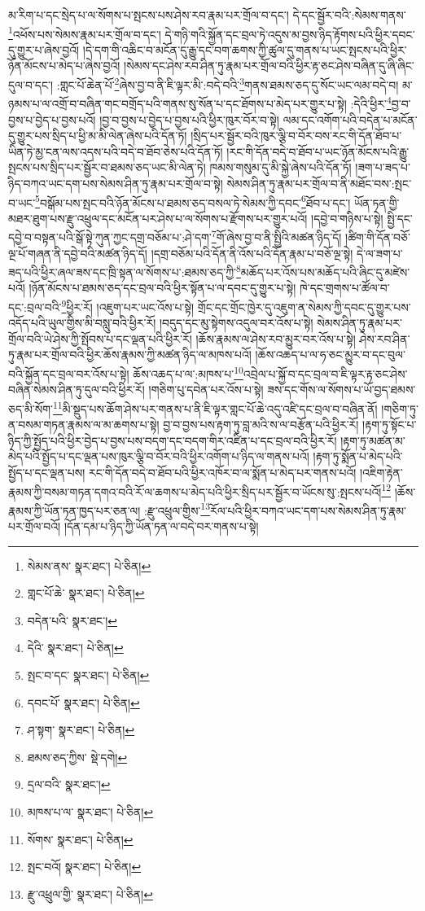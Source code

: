 མ་རིག་པ་དང་སྲེད་པ་ལ་སོགས་པ་སྤངས་པས་ཤེས་རབ་རྣམ་པར་གྲོལ་བ་དང་། དེ་དང་སྦྱོར་བའི་:སེམས་གནས་\footnote{སེམས་ནས་  སྣར་ཐང་།  པེ་ཅིན། }འཕོས་པས་སེམས་རྣམ་པར་གྲོལ་བ་དང་། དེ་གཉི་གའི་སྐྱོན་དང་བྲལ་ཏེ་འདུས་མ་བྱས་ཉིད་རྟོགས་པའི་ཕྱིར་དབང་དུ་གྱུར་པ་ཞེས་བྱའོ། །དེ་དག་གི་འཆིང་བ་མངོན་དུ་རྒྱུ་དང་བག་ཆགས་ཀྱི་ཚུལ་དུ་གནས་པ་ཡང་སྤངས་པའི་ཕྱིར་ཉོན་མོངས་པ་མེད་པ་ཞེས་བྱའོ། །སེམས་དང་ཤེས་རབ་ཤིན་ཏུ་རྣམ་པར་གྲོལ་བའི་ཕྱིར་རྟ་ཅང་ཤེས་བཞིན་དུ་ཞི་ཞིང་དུལ་བ་དང་། :གླང་པོ་ཆེན་པོ་\footnote{གླང་པོ་ཆེ་  སྣར་ཐང་།  པེ་ཅིན། }ཞེས་བྱ་བ་ནི་ཇི་ལྟར་མི་:བདེ་བའི་\footnote{བདེན་པའི་  སྣར་ཐང་། }གནས་ཐམས་ཅད་དུ་སོང་ཡང་ལམ་བདེ་བ། མ་ཉམས་པ་ལ་འགྲོ་བ་བཞིན་གང་བགྲོད་པའི་གནས་སུ་སོན་པ་དང་ཐོགས་པ་མེད་པར་གྱུར་པ་སྟེ། :དེའི་ཕྱིར་\footnote{དེའི་  སྣར་ཐང་།  པེ་ཅིན། }བྱ་བ་བྱས་པ་བྱེད་པ་བྱས་པའོ། །བྱ་བ་བྱས་པ་བྱེད་པ་བྱས་པའི་ཕྱིར་ཁུར་བོར་བ་སྟེ། ལམ་དང་འགོག་པའི་བདེན་པ་མངོན་དུ་གྱུར་པས་སྲིད་པ་ཕྱི་མ་མི་ལེན་ཞེས་པའི་དོན་ཏོ། །སྲིད་པར་སྦྱོར་བའི་ཁུར་ལྕི་བ་བོར་བས་རང་གི་དོན་ཐོབ་པ་ཡིན་ཏེ་མྱ་ངན་ལས་འདས་པའི་བདེ་བ་ཐོབ་ཅེས་པའི་དོན་ཏོ། །རང་གི་དོན་བདེ་བ་ཐོབ་པ་ཡང་ཉོན་མོངས་པའི་རྒྱུ་སྤངས་པས་སྲིད་པར་སྦྱོར་བ་ཐམས་ཅད་ཡང་མི་ལེན་ཏེ། ཁམས་གསུམ་དུ་མི་སྐྱེ་ཞེས་པའི་དོན་ཏོ། །ཟག་པ་ཟད་པ་ཉིད་བཀའ་ཡང་དག་པས་སེམས་ཤིན་ཏུ་རྣམ་པར་གྲོལ་བ་སྟེ། སེམས་ཤིན་ཏུ་རྣམ་པར་གྲོལ་བ་ནི་མཐོང་བས་:སྤང་བ་ཡང་\footnote{སྤང་བ་དང་  སྣར་ཐང་།  པེ་ཅིན། }བསྒོམ་པས་སྤང་བའི་ཉོན་མོངས་པ་ཐམས་ཅད་བསལ་ཏེ་སེམས་ཀྱི་དབང་\footnote{དབང་པོ་  སྣར་ཐང་།  པེ་ཅིན། }ཐོབ་པ་དང་། ཡོན་ཏན་གྱི་མཐར་ཐུག་པས་རྫུ་འཕྲུལ་དང་མངོན་པར་ཤེས་པ་ལ་སོགས་པ་རྫོགས་པར་གྱུར་པའོ། །དབྱེ་བ་གཉིས་པ་སྟེ། སྤྱི་དང་དབྱེ་བ་བསྟན་པའི་སྒོ་སྟེ་ཀུན་ཀྱང་དགྲ་བཅོམ་པ་:ཤེ་དག་\footnote{ཤ་སྟག་  སྣར་ཐང་།  པེ་ཅིན། }གོ་ཞེས་བྱ་བ་ནི་སྤྱིའི་མཚན་ཉིད་དོ། །ཚིག་གི་དོན་བཅོ་ལྔ་པོ་གཞན་ནི་དབྱེ་བའི་མཚན་ཉིད་དོ། །དགྲ་བཅོམ་པའི་དོན་ནི་འོས་པའི་དོན་རྣམ་པ་བཅོ་ལྔ་སྟེ། དེ་ལ་ཟག་པ་ཟད་པའི་ཕྱིར་ཞལ་ཟས་དང་ཁྲི་སྟན་ལ་སོགས་པ་:ཐམས་ཅད་ཀྱི་\footnote{ཐམས་ཅད་ཀྱིས་  སྡེ་དགེ། }མཆོད་པར་འོས་པས་མཆོད་པའི་ཞིང་དུ་མཛེས་པའོ། །ཉོན་མོངས་པ་ཐམས་ཅད་དང་བྲལ་བའི་ཕྱིར་སྟོན་པ་ལ་དབང་དུ་གྱུར་པ་སྟེ། ཁེ་དང་གྲགས་པ་ཚོལ་བ་དང་:བྲལ་བའི་\footnote{དྲལ་བའི་  སྣར་ཐང་། }ཕྱིར་རོ། །འཇུག་པར་ཡང་འོས་པ་སྟེ། གྲོང་དང་གྲོང་ཁྱེར་དུ་འཇུག་ན་སེམས་ཀྱི་དབང་དུ་གྱུར་པས་འདོད་པའི་ཡུལ་གྱིས་མི་བསླུ་བའི་ཕྱིར་རོ། །བདུད་དང་མུ་སྟེགས་འདུལ་བར་འོས་པ་སྟེ། སེམས་ཤིན་ཏུ་རྣམ་པར་གྲོལ་བའི་ཡེ་ཤེས་ཀྱི་སྤོབས་པ་དང་ལྡན་པའི་ཕྱིར་རོ། །ཆོས་རྣམས་ལ་ཤེས་རབ་མྱུར་བར་འོས་པ་སྟེ། ཤེས་རབ་ཤིན་ཏུ་རྣམ་པར་གྲོལ་བའི་ཕྱིར་ཆོས་རྣམས་ཀྱི་མཚན་ཉིད་ལ་མཁས་པའོ། །ཆོས་འཆད་པ་ལ་ཧ་ཅང་མྱུར་བ་དང་བུལ་བའི་སྐྱོན་དང་བྲལ་བར་འོས་པ་སྟེ། ཆོས་འཆད་པ་ལ་:མཁས་པ་\footnote{མཁས་པ་ལ་  སྣར་ཐང་།  པེ་ཅིན། }འབྲེལ་པ་སྐྱོ་བ་དང་བྲལ་བ་ཇི་ལྟར་རྟ་ཅང་ཤེས་བཞིན་སེམས་ཤིན་ཏུ་དུལ་བའི་ཕྱིར་རོ། །གཅིག་པུ་དབེན་པར་འོས་པ་སྟེ། ཟས་དང་གོས་ལ་སོགས་པ་ཡོ་བྱད་ཐམས་ཅད་མི་སོག་\footnote{སོགས་  སྣར་ཐང་།  པེ་ཅིན། }མི་སྡུད་པས་ཆོག་ཤེས་པར་གནས་པ་ནི་ཇི་ལྟར་གླང་པོ་ཆེ་འདུ་འཛི་དང་བྲལ་བ་བཞིན་ནོ། །གཅིག་ཏུ་ན་བསམ་གཏན་རྣམས་ལ་མ་ཆགས་པ་སྟེ། བྱ་བ་བྱས་པས་རྟག་ཏུ་བླ་མའི་ས་ལ་བརྩོན་པའི་ཕྱིར་རོ། །རྟག་ཏུ་སྟོང་པ་ཉིད་ཀྱི་སྤྱོད་པའི་ཕྱིར་བྱེད་པ་བྱས་པས་བདག་དང་བདག་གིར་འཛིན་པ་དང་བྲལ་བའི་ཕྱིར་རོ། །རྟག་ཏུ་མཚན་མ་མེད་པའི་སྤྱོད་པ་དང་ལྡན་པས་ཁུར་ལྕི་བ་བོར་བའི་ཕྱིར་འགོག་པ་ཉིད་ལ་གནས་པའོ། །རྟག་ཏུ་སྨོན་པ་མེད་པའི་སྤྱོད་པ་དང་ལྡན་པས། རང་གི་དོན་བདེ་བ་ཐོབ་པའི་ཕྱིར་འཁོར་བ་ལ་སྨོན་པ་མེད་པར་གནས་པའོ། །འཇིག་རྟེན་རྣམས་ཀྱི་བསམ་གཏན་དགའ་བའི་རོ་ལ་ཆགས་པ་མེད་པའི་ཕྱིར་སྲིད་པར་སྦྱོར་བ་ཡོངས་སུ་:སྤངས་པའོ།\footnote{སྤང་བའོ།  སྣར་ཐང་།  པེ་ཅིན། } །ཆོས་རྣམས་ཀྱི་ཡོན་ཏན་ཁྱད་པར་ཅན་ལ། :རྫུ་འཕྲུལ་གྱིས་\footnote{རྫུ་འཕྲུལ་གྱི་  སྣར་ཐང་།  པེ་ཅིན། }རོལ་པའི་ཕྱིར་བཀའ་ཡང་དག་པས་སེམས་ཤིན་ཏུ་རྣམ་པར་གྲོལ་བའོ། །དོན་དམ་པ་ཉིད་ཀྱི་ཡོན་ཏན་ལ་བདེ་བར་གནས་པ་སྟེ། 